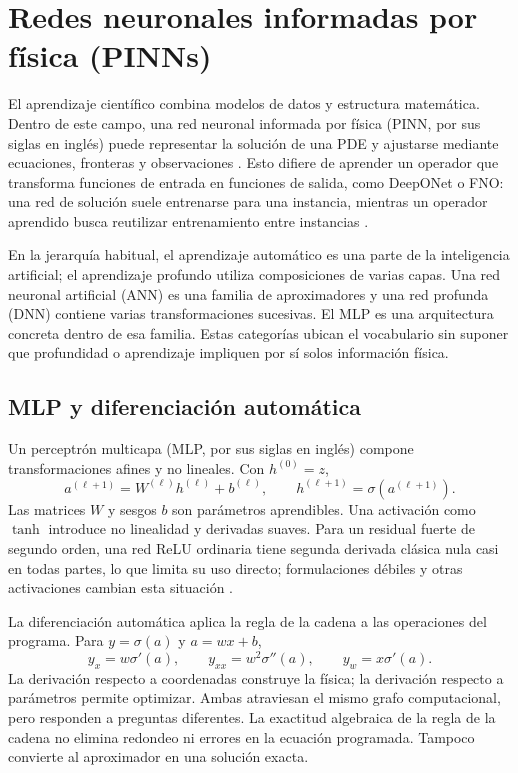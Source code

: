\section{Redes neuronales informadas por física (PINNs)}
El aprendizaje científico combina modelos de datos y estructura matemática. Dentro de este campo, una red neuronal informada por física (PINN, por sus siglas en inglés) puede representar la solución de una PDE y ajustarse mediante ecuaciones, fronteras y observaciones \cite{karniadakis2021}. Esto difiere de aprender un operador que transforma funciones de entrada en funciones de salida, como DeepONet o FNO: una red de solución suele entrenarse para una instancia, mientras un operador aprendido busca reutilizar entrenamiento entre instancias \cite{lu2021deeponet,li2021fno}.

En la jerarquía habitual, el aprendizaje automático es una parte de la inteligencia artificial; el aprendizaje profundo utiliza composiciones de varias capas. Una red neuronal artificial (ANN) es una familia de aproximadores y una red profunda (DNN) contiene varias transformaciones sucesivas. El MLP es una arquitectura concreta dentro de esa familia. Estas categorías ubican el vocabulario sin suponer que profundidad o aprendizaje impliquen por sí solos información física.

\subsection{MLP y diferenciación automática}
Un perceptrón multicapa (MLP, por sus siglas en inglés) compone transformaciones afines y no lineales. Con $h^{(0)}=z$,
\begin{equation}
a^{(\ell+1)}=W^{(\ell)}h^{(\ell)}+b^{(\ell)},\qquad
h^{(\ell+1)}=\sigma(a^{(\ell+1)}).
\end{equation}
Las matrices $W$ y sesgos $b$ son parámetros aprendibles. Una activación como $\tanh$ introduce no linealidad y derivadas suaves. Para un residual fuerte de segundo orden, una red ReLU ordinaria tiene segunda derivada clásica nula casi en todas partes, lo que limita su uso directo; formulaciones débiles y otras activaciones cambian esta situación \cite{lagaris1998,raissi2019}.

La diferenciación automática aplica la regla de la cadena a las operaciones del programa. Para $y=\sigma(a)$ y $a=w x+b$,
\begin{equation}
y_x=w\sigma'(a),\qquad y_{xx}=w^2\sigma''(a),\qquad y_w=x\sigma'(a).
\end{equation}
La derivación respecto a coordenadas construye la física; la derivación respecto a parámetros permite optimizar. Ambas atraviesan el mismo grafo computacional, pero responden a preguntas diferentes. La exactitud algebraica de la regla de la cadena no elimina redondeo ni errores en la ecuación programada. Tampoco convierte al aproximador en una solución exacta.

